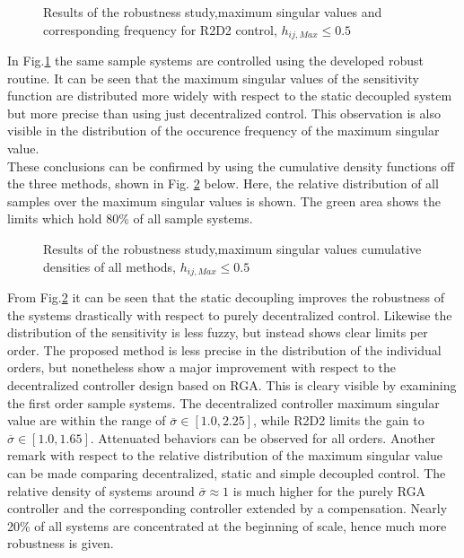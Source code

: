 \begin{figure}[H]\centering

\caption{Results of the robustness study,maximum singular values and corresponding frequency for R2D2 control, $h_{ij,Max} \leq 0.5$}
\label{c:montecarlo:f:msv_d_tsum}
\end{figure}

In Fig.\ref{c:montecarlo:f:msv_d_tsum} the same sample systems are controlled using the developed robust routine. It can be seen that the maximum singular values of the sensitivity function are distributed more widely with respect to the static decoupled system but more precise than using just decentralized control. This observation is also visible in the distribution of the occurence frequency of the maximum singular value.\\

\newpage
These conclusions can be confirmed by using the cumulative density functions off the three methods, shown in Fig. \ref{c:montecarlo:f:mimo_cdf_tsum} below. Here, the relative distribution of all samples over the maximum singular values is shown. The green area shows the limits which hold 80\% of all sample systems.

\begin{figure}[H]\centering

\caption{Results of the robustness study,maximum singular values cumulative densities of all methods, $h_{ij,Max} \leq 0.5$}
\label{c:montecarlo:f:mimo_cdf_tsum}
\end{figure}

From Fig.\ref{c:montecarlo:f:mimo_cdf_tsum} it can be seen that the static decoupling improves the robustness of the systems drastically with respect to purely decentralized control. Likewise the distribution of the sensitivity is less fuzzy, but instead shows clear limits per order. The proposed method is less precise in the distribution of the individual orders, but nonetheless show a major improvement with respect to the decentralized controller design based on RGA. This is cleary visible by examining the first order sample systems. The decentralized controller maximum singular value are within the range of $\overline{\sigma} \in \left[1.0, 2.25 \right]$, while R2D2 limits the gain to $\overline{\sigma} \in \left[1.0, 1.65 \right]$. Attenuated behaviors can be observed for all orders. Another remark with respect to the relative distribution of the maximum singular value can be made comparing decentralized, static and simple decoupled control. The relative density of systems around $\overline{\sigma} \approx 1$ is much higher for the purely RGA controller and the corresponding controller extended by a compensation. Nearly 20\% of all systems are concentrated at the beginning of scale, hence much more robustness is given.\\

